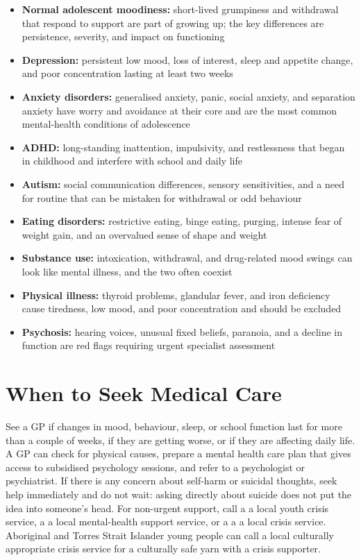 \begin{itemize}
    \item \textbf{Normal adolescent moodiness:} short-lived grumpiness and withdrawal that respond to support are part of growing up; the key differences are persistence, severity, and impact on functioning
    \item \textbf{Depression:} persistent low mood, loss of interest, sleep and appetite change, and poor concentration lasting at least two weeks
    \item \textbf{Anxiety disorders:} generalised anxiety, panic, social anxiety, and separation anxiety have worry and avoidance at their core and are the most common mental-health conditions of adolescence
    \item \textbf{ADHD:} long-standing inattention, impulsivity, and restlessness that began in childhood and interfere with school and daily life
    \item \textbf{Autism:} social communication differences, sensory sensitivities, and a need for routine that can be mistaken for withdrawal or odd behaviour
    \item \textbf{Eating disorders:} restrictive eating, binge eating, purging, intense fear of weight gain, and an overvalued sense of shape and weight
    \item \textbf{Substance use:} intoxication, withdrawal, and drug-related mood swings can look like mental illness, and the two often coexist
    \item \textbf{Physical illness:} thyroid problems, glandular fever, and iron deficiency cause tiredness, low mood, and poor concentration and should be excluded
    \item \textbf{Psychosis:} hearing voices, unusual fixed beliefs, paranoia, and a decline in function are red flags requiring urgent specialist assessment
\end{itemize}

\section*{When to Seek Medical Care}
See a GP if changes in mood, behaviour, sleep, or school function last for more than a couple of weeks, if they are getting worse, or if they are affecting daily life. A GP can check for physical causes, prepare a mental health care plan that gives access to subsidised psychology sessions, and refer to a psychologist or psychiatrist. If there is any concern about self-harm or suicidal thoughts, seek help immediately and do not wait: asking directly about suicide does not put the idea into someone's head. For non-urgent support, call a a local youth crisis service, a a local mental-health support service, or a a a local crisis service. Aboriginal and Torres Strait Islander young people can call a local culturally appropriate crisis service for a culturally safe yarn with a crisis supporter.

